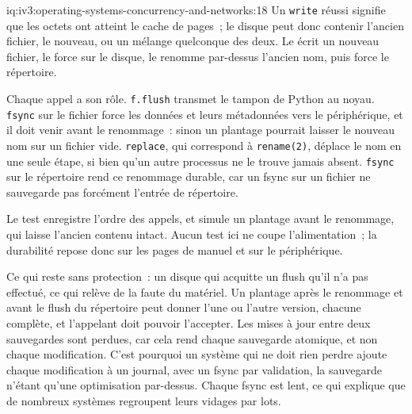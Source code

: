 \begin{solution}{iq:iv3:operating-systems-concurrency-and-networks:18}
Un \texttt{write} réussi signifie que les octets ont atteint le cache de pages~; le disque peut donc contenir l'ancien fichier, le nouveau, ou un mélange quelconque des deux. Le  écrit un nouveau fichier, le force sur le disque, le renomme par-dessus l'ancien nom, puis force le répertoire.
\label{lst:iv3:os:atomicsave}

Chaque appel a son rôle. \texttt{f.flush} transmet le tampon de Python au noyau. \texttt{fsync} sur le fichier force les données et leurs métadonnées vers le périphérique, et il doit venir avant le renommage~: sinon un plantage pourrait laisser le nouveau nom sur un fichier vide. \texttt{replace}, qui correspond à \texttt{rename(2)}, déplace le nom en une seule étape, si bien qu'un autre processus ne le trouve jamais absent. \texttt{fsync} sur le répertoire rend ce renommage durable, car un fsync sur un fichier ne sauvegarde pas forcément l'entrée de répertoire.

Le test enregistre l'ordre des appels, et simule un plantage avant le renommage, qui laisse l'ancien contenu intact. Aucun test ici ne coupe l'alimentation~; la durabilité repose donc sur les pages de manuel et sur le périphérique.

Ce qui reste sans protection~: un disque qui acquitte un flush qu'il n'a pas effectué, ce qui relève de la faute du matériel. Un plantage après le renommage et avant le flush du répertoire peut donner l'une ou l'autre version, chacune complète, et l'appelant doit pouvoir l'accepter. Les mises à jour entre deux sauvegardes sont perdues, car cela rend chaque sauvegarde atomique, et non chaque modification. C'est pourquoi un système qui ne doit rien perdre ajoute chaque modification à un journal, avec un fsync par validation, la sauvegarde n'étant qu'une optimisation par-dessus. Chaque fsync est lent, ce qui explique que de nombreux systèmes regroupent leurs vidages par lots.

\end{solution}

